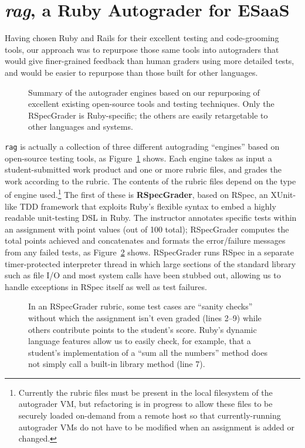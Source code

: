 \section{\emph{rag}, a Ruby Autograder for ESaaS}

Having chosen Ruby and Rails for their excellent testing and
code-grooming tools, our approach was to repurpose those same tools into
autograders that would give finer-grained feedback than human graders
using more detailed tests, and would be easier to repurpose than
those built for other languages.

\begin{figure}
  
  \caption{\label{fig:grader_summary} Summary of the autograder
    engines based on our repurposing of excellent existing open-source
    tools and testing techniques.  Only the RSpecGrader is
    Ruby-specific; the others are easily retargetable to other languages
    and systems.}
\end{figure}

\texttt{rag} 
is actually a collection of three different autograding
``engines'' based on open-source testing
tools, as Figure~\ref{fig:grader_summary} shows.  
Each engine takes as input a student-submitted work
product and one or more rubric files, and grades the work according to
the rubric.  The contents of the rubric files depend on the type of
engine used.\footnote{Currently the rubric files must be present in the
  local filesystem of the autograder VM, but refactoring is in progress
  to allow these files to be securely loaded on-demand from a remote
  host so that currently-running 
  autograder VMs do not have to be modified when an assignment is added
  or changed.}
The first of these is
\textbf{RSpecGrader}, based on RSpec, an XUnit-like 
TDD framework that exploits Ruby's
flexible syntax to embed a highly readable unit-testing DSL in Ruby.
The instructor annotates specific tests within an assignment with point
values (out of 100 total); RSpecGrader computes the total points
achieved and concatenates and formats the error/failure messages from
any failed tests, as Figure~\ref{fig:rspec_grader_rubric} shows.
RSpecGrader  runs RSpec in a separate timer-protected interpreter
thread in which large sections of the
standard library such as file I/O and most system calls have been
stubbed out, allowing us to handle exceptions in RSpec itself as well
as test failures.  

\begin{figure}
  \centering
    
  \caption{\label{fig:rspec_grader_rubric}
    In an RSpecGrader rubric, some test cases are ``sanity checks''
    without which the assignment isn't even graded
    (lines 2--9) while others contribute points to the
    student's score.  Ruby's dynamic language features allow us to
    easily check, for example, that
a student's implementation of a ``sum all the numbers'' method does not
simply call a built-in library method (line 7).
  }
\end{figure}

